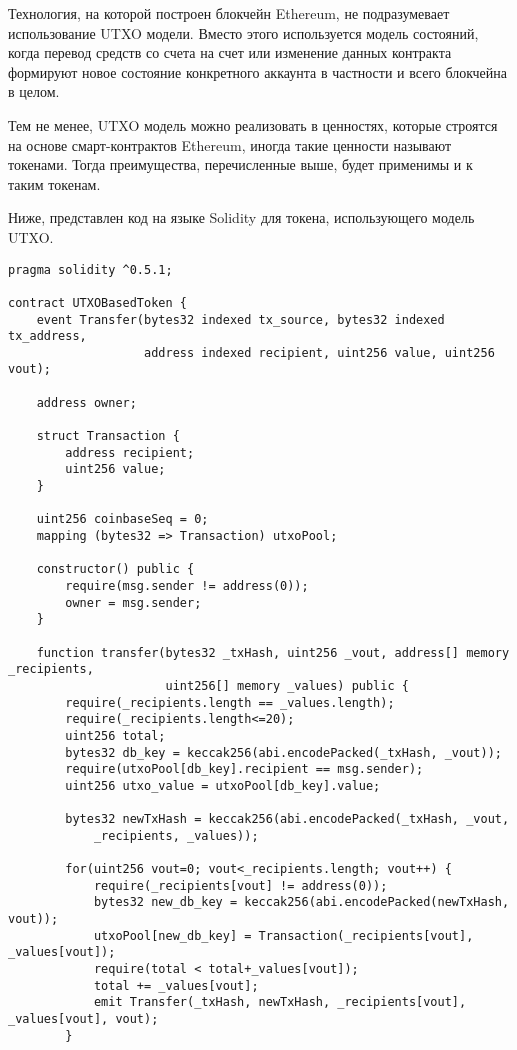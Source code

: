 Технология, на которой построен блокчейн Ethereum, не подразумевает использование UTXO модели. Вместо этого используется модель состояний, когда перевод средств со счета на счет или изменение данных контракта формируют новое состояние конкретного аккаунта в частности и всего блокчейна в целом.

Тем не менее, UTXO модель можно реализовать в ценностях, которые строятся на основе смарт-контрактов Ethereum, иногда такие ценности называют токенами. Тогда преимущества, перечисленные выше, будет применимы и к таким токенам.

Ниже, представлен код на языке Solidity для токена, использующего модель UTXO.

\begin{verbatim}
pragma solidity ^0.5.1;

contract UTXOBasedToken {
    event Transfer(bytes32 indexed tx_source, bytes32 indexed tx_address, 
                   address indexed recipient, uint256 value, uint256 vout);

    address owner;

    struct Transaction {
        address recipient;
        uint256 value;
    }

    uint256 coinbaseSeq = 0;
    mapping (bytes32 => Transaction) utxoPool;
    
    constructor() public {
        require(msg.sender != address(0));
        owner = msg.sender;
    }

    function transfer(bytes32 _txHash, uint256 _vout, address[] memory _recipients, 
                      uint256[] memory _values) public {
        require(_recipients.length == _values.length);
        require(_recipients.length<=20);
        uint256 total;
        bytes32 db_key = keccak256(abi.encodePacked(_txHash, _vout));
        require(utxoPool[db_key].recipient == msg.sender);
        uint256 utxo_value = utxoPool[db_key].value;

        bytes32 newTxHash = keccak256(abi.encodePacked(_txHash, _vout,
            _recipients, _values));

        for(uint256 vout=0; vout<_recipients.length; vout++) {
            require(_recipients[vout] != address(0));
            bytes32 new_db_key = keccak256(abi.encodePacked(newTxHash, vout));
            utxoPool[new_db_key] = Transaction(_recipients[vout], _values[vout]);
            require(total < total+_values[vout]);
            total += _values[vout];
            emit Transfer(_txHash, newTxHash, _recipients[vout], _values[vout], vout);
        }


\end{verbatim}
